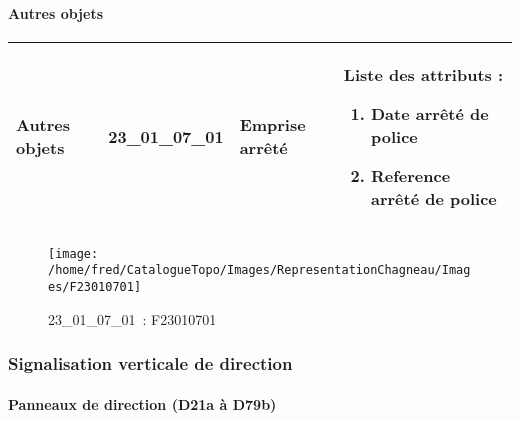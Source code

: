 \documentclass[12pt,titlepage,oneside]{book}
\begin{document}
\paragraph{Autres objets}
\noindent
\vspace{\baselineskip}

\renewcommand{\arraystretch}{1.2}
\begin{supertabular}{|p{10cm}|c|p{13cm}|p{12cm}|}
 Autres objets & 23\_01\_07\_01 & Emprise arrêté & Liste des attributs :
\begin{enumerate}
  \item Date arrêté de police  \item Reference arrêté de police\end{enumerate}
\\
\hline
\end{supertabular}
\begin{figure}[h!]
  \hfill         %
  \begin{minipage}[t]{3cm}
    \begin{center}
      \texttt{[image: /home/fred/CatalogueTopo/Images/RepresentationChagneau/Images/F23010701]}
      \caption[~23\_01\_07\_01]{\small{23\_01\_07\_01~:} \tiny{F23010701}}\label{F23010701}
    \end{center}
  \end{minipage}
\end{figure}

\subsubsection{\large Signalisation verticale de direction}
\paragraph{Panneaux de direction (D21a à D79b)}
\noindent
\vspace{\baselineskip}
\end{document}
